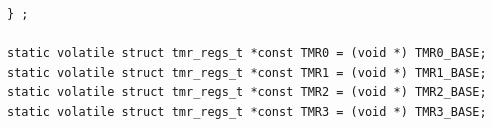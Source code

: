 \begin{lstlisting}
} ;

static volatile struct tmr_regs_t *const TMR0 = (void *) TMR0_BASE;
static volatile struct tmr_regs_t *const TMR1 = (void *) TMR1_BASE;
static volatile struct tmr_regs_t *const TMR2 = (void *) TMR2_BASE;
static volatile struct tmr_regs_t *const TMR3 = (void *) TMR3_BASE;

\end{lstlisting}
